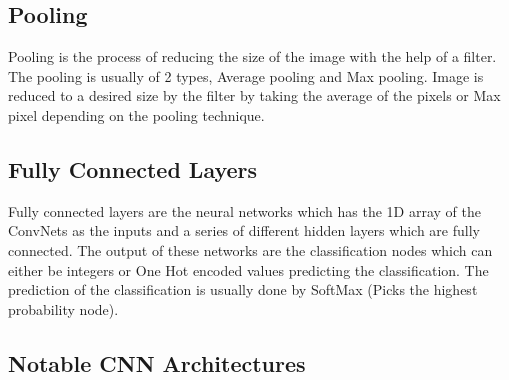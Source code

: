 \subsection{Pooling}
Pooling is the process of reducing the size of the image with the help of a filter. The pooling is usually of 2 types, Average pooling and Max pooling. Image is reduced to a desired size by the filter by taking the average of the pixels or Max pixel depending on the pooling technique.
\subsection{Fully Connected Layers}
Fully connected layers are the neural networks which has the 1D array of the ConvNets as the inputs and a series of different hidden layers which are fully connected. The output of these networks are the classification nodes which can either be integers or One Hot encoded values predicting the classification. The prediction of the classification is usually done by SoftMax (Picks the highest probability node).
\subsection{Notable CNN Architectures}
